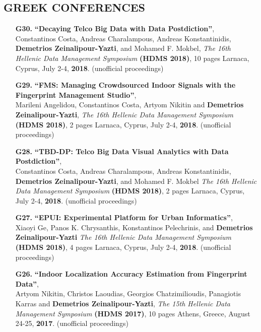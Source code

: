 \documentclass[10pt]{article}
\begin{document}
\subsection*{\bf  GREEK CONFERENCES}
\begin{enumerate}

\item[{\bf G30.}]
\label{G30} %
{\bf ``Decaying Telco Big Data with Data Postdiction''}, \\
Constantinos Costa, Andreas Charalampous, Andreas Konstantinidis, {\bf Demetrios Zeinalipour-Yazti}, and Mohamed F. Mokbel,
{\em The 16th Hellenic Data Management Symposium} {\bf (HDMS 2018)}, 10 pages
Larnaca, Cyprus, July 2-4, {\bf 2018}. (unofficial proceedings)

\item[{\bf G29.}]
\label{G29} %
{\bf ``FMS: Managing Crowdsourced Indoor Signals with the Fingerprint Management Studio''}, \\
Marileni Angelidou, Constantinos Costa, Artyom Nikitin and {\bf Demetrios Zeinalipour-Yazti},
{\em The 16th Hellenic Data Management Symposium} {\bf (HDMS 2018)}, 2 pages
Larnaca, Cyprus, July 2-4, {\bf 2018}. (unofficial proceedings)

\item[{\bf G28.}]
\label{G28} %
{\bf ``TBD-DP: Telco Big Data Visual Analytics with Data Postdiction''}, \\
Constantinos Costa, Andreas Charalampous, Andreas Konstantinidis, {\bf Demetrios Zeinalipour-Yazti}, and Mohamed F. Mokbel
{\em The 16th Hellenic Data Management Symposium} {\bf (HDMS 2018)}, 2 pages
Larnaca, Cyprus, July 2-4, {\bf 2018}. (unofficial proceedings)

\item[{\bf G27.}]
\label{G27} %
{\bf ``EPUI: Experimental Platform for Urban Informatics''}, \\
Xiaoyi Ge, Panos K. Chrysanthis, Konstantinos Pelechrinis, and {\bf Demetrios Zeinalipour-Yazti}
{\em The 16th Hellenic Data Management Symposium} {\bf (HDMS 2018)}, 4 pages
Larnaca, Cyprus, July 2-4, {\bf 2018}. (unofficial proceedings)

\item[{\bf G26.}]
\label{G26}
{\bf ``Indoor Localization Accuracy Estimation from Fingerprint Data''}, \\
Artyom Nikitin, Christos Laoudias,  Georgios Chatzimilioudis, Panagiotis Karras and {\bf Demetrios Zeinalipour-Yazti},
{\em The 15th Hellenic Data Management Symposium} {\bf (HDMS 2017)}, 10 pages
Athens, Greece, August 24-25, {\bf 2017}. (unofficial proceedings)


\end{enumerate}
\end{document}
